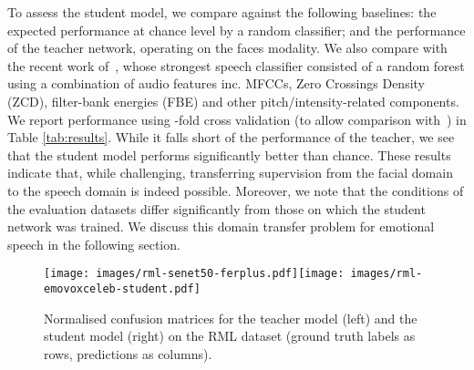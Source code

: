 \documentclass[sigconf]{acmart}
\begin{document}
To assess the student model, we compare against the following baselines: the expected performance at chance level by a random classifier;  and the performance of the teacher network, operating on the faces modality. We also compare with the recent work of~\cite{noroozi2017audio}, whose strongest speech classifier consisted of a random forest using a combination of  audio features inc. MFCCs, Zero Crossings Density (ZCD), filter-bank energies (FBE) and other pitch/intensity-related components. We report performance using -fold cross validation (to allow comparison with~\cite{noroozi2017audio}) in Table \ref{tab:results}.  While it falls short of the performance of the teacher, we see that the student model performs significantly better than chance. These results indicate that, while challenging, transferring supervision from the facial domain to the speech domain is indeed possible.  
Moreover, we note that the conditions of the evaluation datasets
differ significantly from  those on which the student network was trained.
We discuss this domain transfer problem for emotional speech in the following section.

\begin{figure}[ht]
\centering
\texttt{[image: images/rml-senet50-ferplus.pdf]}\texttt{[image: images/rml-emovoxceleb-student.pdf]}
   \caption{Normalised confusion matrices for the teacher model (left) and the student model (right) on the RML dataset (ground truth labels as rows, predictions as columns).}
\label{fig:confmats}
\end{figure}
\end{document}
